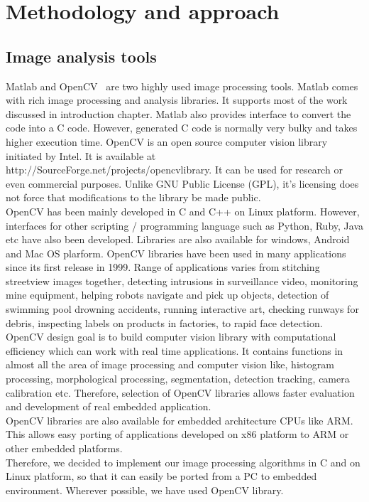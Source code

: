 
\chapter{Methodology and approach} %
\label{Chapter2}

\section{Image analysis tools}
\indent Matlab and OpenCV~\cite{34} are two highly used image
processing tools.  Matlab comes with rich image processing and analysis
libraries. It supports most of the work discussed in introduction
chapter. Matlab also provides interface to convert the code into a C
code. However, generated C code is normally very bulky and takes higher
execution time. OpenCV is an open source computer vision library
initiated by Intel. It is available at
http://SourceForge.net/projects/opencvlibrary. It can be used for
research or even commercial purposes. Unlike GNU Public License (GPL),
it's licensing does not force that modifications to the library be made
public. \\
\indent OpenCV has been mainly developed in C and C++ on Linux platform.
However, interfaces for other scripting / programming language such as
Python, Ruby, Java etc have also been developed. Libraries are also
available for windows, Android and Mac OS plarform. OpenCV libraries
have been used in many applications since its first release in 1999.
Range of applications varies from stitching streetview images together,
detecting intrusions in surveillance video, monitoring mine equipment,
helping robots navigate and pick up objects, detection of swimming pool
drowning accidents, running interactive art, checking runways for
debris, inspecting labels on products in factories, to rapid face
detection.\\
\indent OpenCV design goal is to build computer vision library with
computational efficiency which can work with real time applications. It
contains functions in almost all the area of image processing  and
computer vision like, histogram processing, morphological processing,
segmentation, detection tracking, camera calibration etc. Therefore,
selection of OpenCV libraries allows faster evaluation and development
of real embedded application.\\
\indent OpenCV libraries are also available for embedded architecture
CPUs like ARM. This allows easy porting of applications developed on x86
platform to ARM or other embedded platforms.\\
\indent Therefore, we decided to implement our image processing
algorithms in C and on Linux platform, so that it can easily be ported
from a PC to embedded environment. Wherever possible, we have used
OpenCV library.
